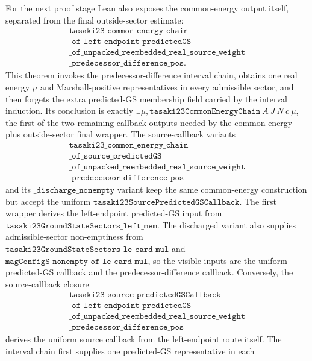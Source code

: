 \documentclass[a4paper,11pt]{article}
\begin{document}
For the next proof stage Lean also exposes the common-energy output
itself, separated from the final outside-sector estimate:
\[
\begin{gathered}
\texttt{tasaki23\_common\_energy\_chain}\\
\texttt{\_of\_left\_endpoint\_predictedGS}\\
\texttt{\_of\_unpacked\_reembedded\_real\_source\_weight}\\
\texttt{\_predecessor\_difference\_pos}.
\end{gathered}
\]
This theorem invokes the predecessor-difference interval chain, obtains
one real energy \(\mu\) and Marshall-positive representatives in every
admissible sector, and then forgets the extra predicted-GS membership
field carried by the interval induction.  Its conclusion is exactly
\(\exists \mu,\texttt{tasaki23CommonEnergyChain}~A~J~N~c~\mu\), the first
of the two remaining callback outputs needed by the common-energy plus
outside-sector final wrapper.
The source-callback variants
\[
\begin{gathered}
\texttt{tasaki23\_common\_energy\_chain}\\
\texttt{\_of\_source\_predictedGS}\\
\texttt{\_of\_unpacked\_reembedded\_real\_source\_weight}\\
\texttt{\_predecessor\_difference\_pos}
\end{gathered}
\]
and its \(\texttt{\_discharge\_nonempty}\) variant keep the same
common-energy construction but accept the uniform
\(\texttt{tasaki23SourcePredictedGSCallback}\).  The first wrapper
derives the left-endpoint predicted-GS input from
\(\texttt{tasaki23GroundStateSectors\_left\_mem}\).  The discharged
variant also supplies admissible-sector non-emptiness from
\(\texttt{tasaki23GroundStateSectors\_le\_card\_mul}\) and
\(\texttt{magConfigS\_nonempty\_of\_le\_card\_mul}\), so the visible
inputs are the uniform predicted-GS callback and the
predecessor-difference callback.
Conversely, the source-callback closure
\[
\begin{gathered}
\texttt{tasaki23\_source\_predictedGSCallback}\\
\texttt{\_of\_left\_endpoint\_predictedGS}\\
\texttt{\_of\_unpacked\_reembedded\_real\_source\_weight}\\
\texttt{\_predecessor\_difference\_pos}
\end{gathered}
\]
derives the uniform source callback from the left-endpoint route itself.
The interval chain first supplies one predicted-GS representative in each
\end{document}
